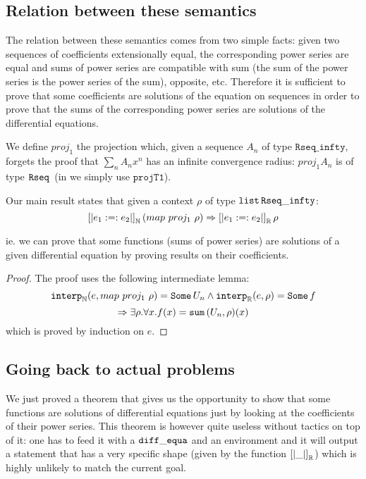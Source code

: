 \documentclass{article}
\begin{document}
\subsection{Relation between these semantics}

The relation between these semantics comes from two simple facts: given two
sequences of coefficients extensionally equal, the corresponding power
series are equal and sums of power series are compatible with sum (the sum
of the power series is the power series of the sum), opposite, etc.
Therefore it is sufficient to prove that some coefficients are solutions of
the equation on sequences in order to prove that the sums of the corresponding
power series are solutions of the differential equations.

We define $proj_1$ the projection which, given a sequence $A_n$ of type
$\mathtt{Rseq\_infty}$, forgets the proof that $\sum_n A_n x^n$ has an
infinite convergence radius: $proj_1 A_n$ is of type $\operatorname{\mathtt{Rseq}}{}$ (in \coq{} we
simply use $\mathtt{projT1}$).

\begin{theorem} Our main result states that given a context
$\rho$ of type $\operatorname{\mathtt{list}}{} \mathtt{Rseq\_infty}$:
$$\left[\left| e_1 :=: e_2 \right|\right]_{\mathbb{N}} (map ~ proj_1 ~ \rho) \Rightarrow
\left[\left| e_1 :=: e_2 \right|\right]_{\mathbb{R}} \rho$$

ie. we can prove that some functions (sums of power series) are solutions
of a given differential equation by proving results on their coefficients.
\end{theorem}

\begin{proof} The proof uses the following intermediate lemma:
$$\operatorname{\operatorname{\mathtt{interp}}_{\mathbb{N}}}(e, map ~ proj_1 ~ \rho) = \operatorname{\mathtt{Some}} U_n \wedge \operatorname{\operatorname{\mathtt{interp}}_{\mathbb{R}}}(e, \rho) = \operatorname{\mathtt{Some}} f$$
$$\Rightarrow \exists \rho. \forall x. f(x) = \operatorname{\mathtt{sum}}{}(U_n, \rho)(x)$$
which is proved by induction on $e$.
\end{proof}

\subsection{Going back to actual problems}

We just proved a theorem that gives us the opportunity to show that some functions
are solutions of differential equations just by looking at the coefficients of
their power series. This theorem is however quite useless without tactics on top
of it: one has to feed it with a $\operatorname{\mathtt{diff\_equa}}$ and an environment and it will output a
statement that has a very specific shape (given by the function $\left[\left|
 \_ \right|\right]_{\mathbb{R}}$) which is highly unlikely to match the current goal.
\end{document}
